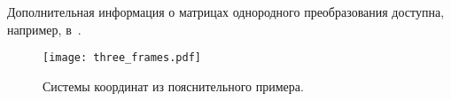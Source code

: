 Дополнительная информация о матрицах однородного преобразования доступна, например, в~\cite{}.

\begin{figure}[h!]
	\centering
	\texttt{[image: three\_frames.pdf]}
	\caption{Системы координат из пояснительного примера.}
	\label{img:three_frames}
\end{figure}